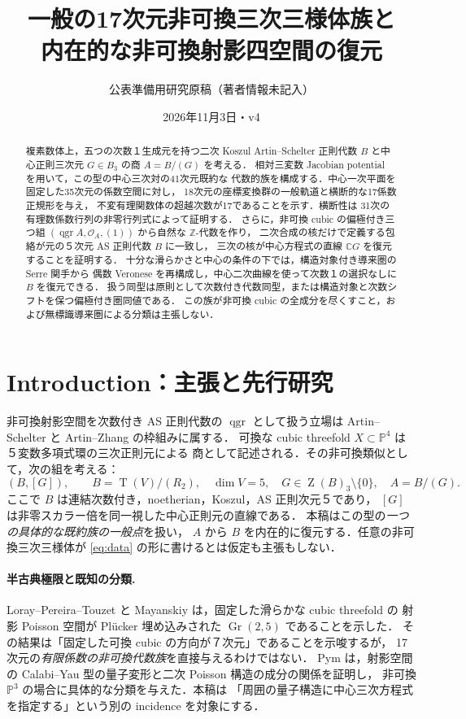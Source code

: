 \documentclass[11pt,a4paper]{ltjsarticle}
\title{一般の17次元非可換三次三様体族と\\内在的な非可換射影四空間の復元}
\author{公表準備用研究原稿（著者情報未記入）}
\date{2026年11月3日・v4}
\numberwithin{equation}{section}
\newcommand{\C}{\mathbb C}
\newcommand{\PP}{\mathbb P}
\newcommand{\OO}{\mathcal O}
\newcommand{\qgr}{\operatorname{qgr}}
\newcommand{\Z}{\operatorname{Z}}
\newcommand{\Tens}{\operatorname{T}}
\begin{document}
\maketitle
\begin{abstract}
複素数体上，五つの次数１生成元を持つ二次 Koszul Artin--Schelter 正則代数
$B$ と中心正則三次元 $G\in B_3$ の商 $A=B/(G)$ を考える．
相対三変数 Jacobian potential を用いて，この型の中心三次対の41次元既約な
代数的族を構成する．中心一次平面を固定した35次元の係数空間に対し，
18次元の座標変換群の一般軌道と横断的な17係数正規形を与え，
不変有理関数体の超越次数が17であることを示す．横断性は
31次の有理数係数行列の非零行列式によって証明する．
さらに，非可換 cubic の偏極付き三つ組
$(\qgr A,\OO_A,(1))$ から自然な $\mathbb Z$-代数を作り，
二次合成の核だけで定義する包絡が元の５次元 AS 正則代数 $B$ に一致し，
三次の核が中心方程式の直線 $\C G$ を復元することを証明する．
十分な滑らかさと中心の条件の下では，構造対象付き導来圏の Serre 関手から
偶数 Veronese を再構成し，中心二次曲線を使って次数１の選択なしに $B$ を復元できる．
扱う同型は原則として次数付き代数同型，または構造対象と次数シフトを保つ偏極付き圏同値である．
この族が非可換 cubic の全成分を尽くすこと，および無標識導来圏による分類は主張しない．
\end{abstract}
\tableofcontents

\section{Introduction：主張と先行研究}\label{sec:intro}
非可換射影空間を次数付き AS 正則代数の $\qgr$ として扱う立場は
Artin--Schelter \cite{AS} と Artin--Zhang \cite{AZ} の枠組みに属する．
可換な cubic threefold $X\subset\PP^4$ は５変数多項式環の三次正則元による
商として記述される．その非可換類似として，次の組を考える：
\begin{equation}\label{eq:data}
 (B,[G]),\qquad B=\Tens(V)/(R_2),\quad\dim V=5,\quad
 G\in\Z(B)_3\setminus\{0\},\quad A=B/(G).
\end{equation}
ここで $B$ は連結次数付き，noetherian，Koszul，AS 正則次元５であり，
$[G]$ は非零スカラー倍を同一視した中心正則元の直線である．
本稿はこの型の\emph{一つの具体的な既約族の一般点}を扱い，
$A$ から $B$ を内在的に復元する．任意の非可換三次三様体が
\eqref{eq:data} の形に書けるとは仮定も主張もしない．

\paragraph{半古典極限と既知の分類.}
Loray--Pereira--Touzet \cite[Theorem~9.1]{LPT} と
Mayanskiy \cite[Theorem~1]{Mayanskiy} は，固定した滑らかな cubic threefold の
射影 Poisson 空間が Pl\"ucker 埋め込みされた $\operatorname{Gr}(2,5)$ であることを示した．
その結果は「固定した可換 cubic の方向が７次元」であることを示唆するが，
17次元の\emph{有限係数の非可換代数族}を直接与えるわけではない．
Pym \cite[Proposition~2.9, Theorem~2.10]{Pym} は，射影空間の
Calabi--Yau 型の量子変形と二次 Poisson 構造の成分の関係を証明し，
非可換 $\PP^3$ の場合に具体的な分類を与えた．本稿は
「周囲の量子構造に中心三次方程式を指定する」という別の incidence を対象にする．
\end{document}
